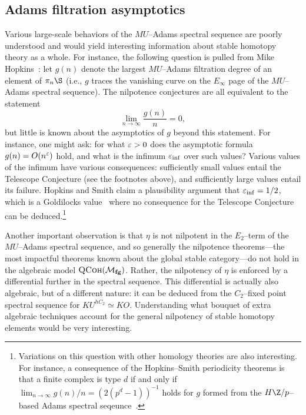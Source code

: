 \subsection*{Adams filtration asymptotics}

Various large-scale behaviors of the \(MU\)--Adams spectral sequence are poorly understood and would yield interesting information about stable homotopy theory as a whole.  For instance, the following question is pulled from Mike Hopkins~\cite[Section 10]{HopkinsOnRavenel}: let \(g(n)\) denote the largest \(MU\)--Adams filtration degree of an element of \(\pi_n \S\) (i.e., \(g\) traces the vanishing curve on the \(E_\infty\) page of the \(MU\)--Adams spectral sequence).  The nilpotence conjectures are all equivalent to the statement \[\lim_{n \to \infty} \frac{g(n)}{n} = 0,\] but little is known about the asymptotics of \(g\) beyond this statement.  For instance, one might ask: for what \(\varepsilon > 0\) does the asymptotic formula \(g(n) = O(n^{\varepsilon})\) hold, and what is the infimum \(\varepsilon_{\inf}\) over such values?  Various values of the infimum have various consequences: sufficiently small values entail the Telescope Conjecture (see the footnotes above), and sufficiently large values entail its failure.  Hopkins and Smith claim a plausibility argument that \(\varepsilon_{\inf} = 1/2\), which is a Goldilocks value~\cite{Dicke} where no consequence for the Telescope Conjecture can be deduced.\footnote{Variations on this question with other homology theories are also interesting.  For instance, a consequence of the Hopkins--Smith periodicity theorems is that a finite complex is type \(d\) if and only if \(\lim_{n \to \infty} g(n) / n = (2(p^d-1))^{-1}\) holds for \(g\) formed from the \(H\Z/p\)--based Adams spectral seqeunce~\cite[Section 3.5]{HopkinsICMZurich}.}

Another important observation is that \(\eta\) is not nilpotent in the \(E_2\)--term of the \(MU\)--Adams spectral sequence, and so generally the nilpotence theorems---the most impactful theorems known about the global stable category---do not hold in the algebraic model \(\normalfont\textsc{QCoh}(\mathcal{M}_{\mathbf{fg}})\).  Rather, the nilpotency of \(\eta\) is enforced by a differential further in the spectral sequence.  This differential is actually also algebraic, but of a different nature: it can be deduced from the \(C_2\)--fixed point spectral sequence for \(KU^{hC_2} \simeq KO\).  Understanding what bouquet of extra algebraic techniques account for the general nilpotency of stable homotopy elements would be very interesting.

